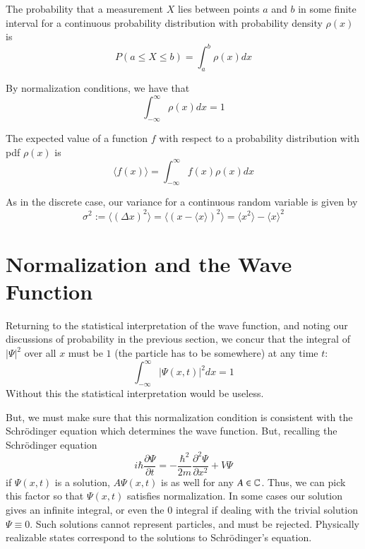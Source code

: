 \documentclass[12pt, a4paper, oneside, openright, titlepage]{book}
\begin{document}
\begin{defn}
    The probability that a measurement $X$ lies between points $a$ and $b$ in some finite interval for a continuous probability distribution with probability density $\rho(x)$ is \begin{equation*}
        P(a \leq X \leq b) = \int_a^b\rho(x)dx
    \end{equation*}
\end{defn}

By normalization conditions, we have that \begin{equation*}
    \int_{-\infty}^{\infty}\rho(x)dx = 1
\end{equation*}

\begin{defn}
    The expected value of a function $f$ with respect to a probability distribution with pdf $\rho(x)$ is $$\langle f(x)\rangle = \int_{-\infty}^{\infty}f(x)\rho(x)dx$$
\end{defn}

As in the discrete case, our variance for a continuous random variable is given by $$\sigma^2 := \langle (\Delta x)^2\rangle = \langle (x-\langle x\rangle)^2\rangle = \langle x^2\rangle - \langle x\rangle^2$$


\section{Normalization and the Wave Function}

Returning to the statistical interpretation of the wave function, and noting our discussions of probability in the previous section, we concur that the integral of $|\Psi|^2$ over all $x$ must be $1$ (the particle has to be somewhere) at any time $t$: $$\boxed{\int_{-\infty}^{\infty}|\Psi(x,t)|^2dx = 1}$$ Without this the statistical interpretation would be useless.

But, we must make sure that this normalization condition is consistent with the Schr\"{o}dinger equation which determines the wave function. But, recalling the Schr\"{o}dinger equation $$i\hbar\frac{\partial \Psi}{\partial t} = -\frac{\hbar^2}{2m}\frac{\partial^2\Psi}{\partial x^2}+V\Psi$$ if $\Psi(x,t)$ is a solution, $A\Psi(x,t)$ is as well for any $A \in \mathbb C$. Thus, we can pick this factor so that $\Psi(x,t)$ satisfies normalization. In some cases our solution gives an infinite integral, or even the $0$ integral if dealing with the trivial solution $\Psi \equiv 0$. Such  solutions cannot represent particles, and must be rejected. Physically realizable states correspond to the  solutions to Schr\"{o}dinger's equation.
\end{document}
